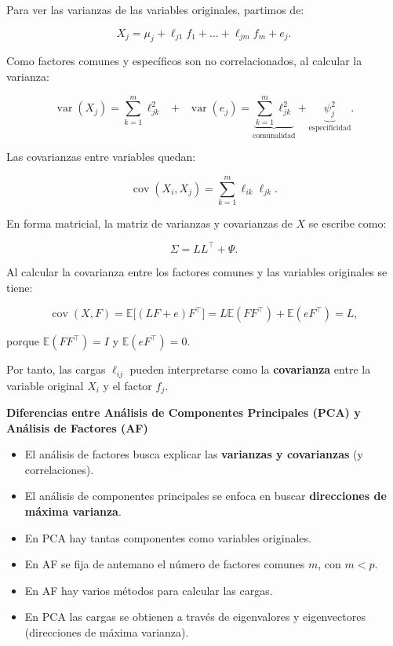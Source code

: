 \documentclass[
]{book}
\providecommand{\tightlist}{%
  \setlength{\itemsep}{0pt}\setlength{\parskip}{0pt}}
\begin{document}
Para ver las varianzas de las variables originales, partimos de:

\[
X_j = \mu_j + \ell_{j1} f_1 + \dots + \ell_{jm} f_m + e_j.
\]

Como factores comunes y específicos son no correlacionados, al calcular la varianza:

\[
\operatorname{var}(X_j) = 
\sum_{k=1}^m \ell_{jk}^2
\;\;+\;\; \operatorname{var}(e_j)
= \underbrace{\sum_{k=1}^m \ell_{jk}^2}_{\text{comunalidad}}
+ \underbrace{\psi_j^2}_{\text{especificidad}}.
\]

Las covarianzas entre variables quedan:

\[
\operatorname{cov}(X_i, X_j)
= \sum_{k=1}^m \ell_{ik} \ell_{jk}.
\]

En forma matricial, la matriz de varianzas y covarianzas de \(X\) se escribe como:

\[
\Sigma = LL^\top + \Psi.
\]

Al calcular la covarianza entre los factores comunes y las variables originales se tiene:

\[
\operatorname{cov}(X, F)
= \mathbb{E}\big[(L F + e) F^\top\big]
= L \mathbb{E}(FF^\top) + \mathbb{E}(eF^\top)
= L,
\]

porque \(\mathbb{E}(FF^\top) = I\) y \(\mathbb{E}(eF^\top) = 0\).

Por tanto, las cargas \(\ell_{ij}\) pueden interpretarse como la \textbf{covarianza} entre la variable original \(X_i\) y el factor \(f_j\).

\textbf{Diferencias entre Análisis de Componentes Principales (PCA) y Análisis de Factores (AF)}

\begin{itemize}
\tightlist
\item
  El análisis de factores busca explicar las \textbf{varianzas y covarianzas} (y correlaciones).
\item
  El análisis de componentes principales se enfoca en buscar \textbf{direcciones de máxima varianza}.
\item
  En PCA hay tantas componentes como variables originales.
\item
  En AF se fija de antemano el número de factores comunes \(m\), con \(m < p\).
\item
  En AF hay varios métodos para calcular las cargas.
\item
  En PCA las cargas se obtienen a través de eigenvalores y eigenvectores (direcciones de máxima varianza).
\end{itemize}
\end{document}
